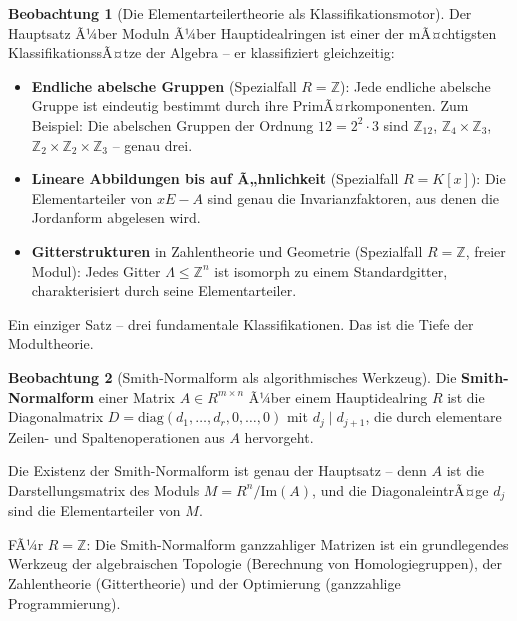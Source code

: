 ﻿\documentclass[a4paper,12pt]{report}
\theoremstyle{definition}
\newtheorem{beobachtung}{Beobachtung}
\begin{document}
\begin{beobachtung}[Die Elementarteilertheorie als Klassifikationsmotor]
    Der Hauptsatz Ã¼ber Moduln Ã¼ber Hauptidealringen ist einer der
    mÃ¤chtigsten KlassifikationssÃ¤tze der Algebra -- er klassifiziert
    gleichzeitig:
    \begin{itemize}
        \item[-] \textbf{Endliche abelsche Gruppen} (Spezialfall $R = \mathbb{Z}$):
              Jede endliche abelsche Gruppe ist eindeutig bestimmt
              durch ihre PrimÃ¤rkomponenten. Zum Beispiel:
              Die abelschen Gruppen der Ordnung $12 = 2^2 \cdot 3$ sind
              $\mathbb{Z}_{12}$, $\mathbb{Z}_4 \times \mathbb{Z}_3$,
              $\mathbb{Z}_2 \times \mathbb{Z}_2 \times \mathbb{Z}_3$ -- genau drei.
        \item[-] \textbf{Lineare Abbildungen bis auf Ã„hnlichkeit}
              (Spezialfall $R = K[x]$): Die Elementarteiler von $xE - A$
              sind genau die Invarianzfaktoren, aus denen die Jordanform
              abgelesen wird.
        \item[-] \textbf{Gitterstrukturen} in Zahlentheorie und Geometrie
              (Spezialfall $R = \mathbb{Z}$, freier Modul): Jedes
              Gitter $\Lambda \leq \mathbb{Z}^n$ ist isomorph zu einem
              Standardgitter, charakterisiert durch seine Elementarteiler.
    \end{itemize}
    Ein einziger Satz -- drei fundamentale Klassifikationen.
    Das ist die Tiefe der Modultheorie.
\end{beobachtung}

\begin{beobachtung}[Smith-Normalform als algorithmisches Werkzeug]
    Die \textbf{Smith-Normalform} einer Matrix $A \in R^{m \times n}$
    Ã¼ber einem Hauptidealring $R$ ist die Diagonalmatrix
    $D = \mathrm{diag}(d_1, \ldots, d_r, 0, \ldots, 0)$ mit
    $d_j \mid d_{j+1}$, die durch elementare Zeilen- und Spaltenoperationen
    aus $A$ hervorgeht.

    Die Existenz der Smith-Normalform ist genau der Hauptsatz -- denn
    $A$ ist die Darstellungsmatrix des Moduls $M = R^n / \mathrm{Im}(A)$,
    und die DiagonaleintrÃ¤ge $d_j$ sind die Elementarteiler von $M$.

    FÃ¼r $R = \mathbb{Z}$: Die Smith-Normalform ganzzahliger Matrizen
    ist ein grundlegendes Werkzeug der algebraischen Topologie
    (Berechnung von Homologiegruppen), der Zahlentheorie (Gittertheorie)
    und der Optimierung (ganzzahlige Programmierung).
\end{beobachtung}
\end{document}
